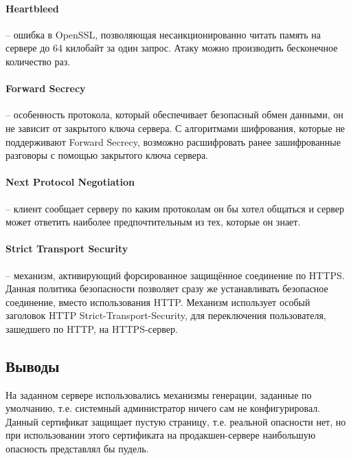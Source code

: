 \paragraph{Heartbleed} -- ошибка в OpenSSL, позволяющая несанкционированно читать память на сервере до 64 килобайт за один запрос. Атаку можно производить бесконечное количество раз.

\paragraph{Forward Secrecy} -- особенность протокола, который обеспечивает безопасный обмен данными, он не зависит от закрытого ключа сервера. С алгоритмами шифрования, которые не поддерживают Forward Secrecy, возможно расшифровать ранее зашифрованные разговоры с помощью закрытого ключа сервера.

\paragraph{Next Protocol Negotiation} -- клиент сообщает серверу по каким протоколам он бы хотел общаться и сервер может ответить наиболее предпочтительным из тех, которые он знает.

\paragraph{Strict Transport Security} -- механизм, активирующий форсированное защищённое соединение по HTTPS. Данная политика безопасности позволяет сразу же устанавливать безопасное соединение, вместо использования HTTP. Механизм использует особый заголовок HTTP Strict-Transport-Security, для переключения пользователя, зашедшего по HTTP, на HTTPS-сервер.

\subsection{Выводы}

На заданном сервере использовались механизмы генерации, заданные по умолчанию, т.е. системный администратор ничего сам не конфигурировал. Данный сертификат защищает пустую страницу, т.е. реальной опасности нет, но при использовании этого сертификата на продакшен-сервере наибольшую опасность представлял бы пудель.